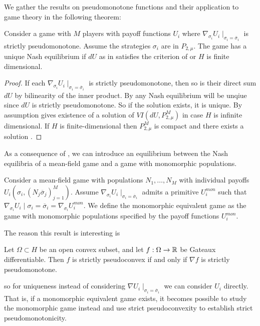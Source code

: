 We gather the results on pseudomonotone functions and their application to game theory in the following theorem:
\begin{theorem} \label{thm:nash_unique}
  Consider a game with $M$ players with payoff functions $U_i$ where $\nabla_{\sigma_i} U_i \mid_{\sigma_i = \overbar{\sigma}_i}$ is strictly pseudomonotone. Assume the strategies $\sigma_i$ are in $P_{2,\mu}$. The game has a unique Nash equilibrium if $dU$ as in  satisfies the criterion of  or $H$ is finite dimensional.
\end{theorem}
\begin{proof}
   If each $\nabla_{\sigma_i} U_i \mid_{\sigma_i = \overbar{\sigma}_i}$ is strictly pseudomonotone, then so is their direct sum $dU$ by bilinearity of the inner product. By  any Nash equilibrium will be unqiue since $dU$ is strictly pseudomonotone. So if the solution exists, it is unique. By assumption  gives existence of a solution of $VI(dU,P_{2,\mu}^M)$ in case $H$ is infinite dimensional. If $H$ is finite-dimensional then $P_{2,\mu}^M$ is compact and there exists a solution .
\end{proof}
As a consequence of , we can introduce an equilibrium between the Nash equilibria of a mean-field game and a game with monomorphic populations.
\begin{definition}
  \label{def:correspondence}
  Consider a mean-field game with populations $N_1,\dots,N_M$ with individual payoffs $U_i(\sigma_i, (N_j \overbar{\sigma}_j)_{j=1}^M)$. Assume $\nabla_{\sigma_i}U_i\mid_{\sigma_i=\overbar{\sigma}_i}$ admits a primitive $U_i^{mon}$ such that $\nabla_{\sigma_i} U_i\mid{\sigma_i = \overbar{\sigma}_i} = \nabla_{\sigma_i} U_i^{mon}$.
   We define the monomorphic equivalent game as the game with monomorphic populations specified by the payoff functions $U_i^{mon}$.
\end{definition}
The reason this result is interesting is
\begin{theorem}
  Let $\Omega \subset H$ be an open convex subset, and let $f:\Omega \to \mathbb{R}$ be Gateaux differentiable. Then $f$ is strictly pseudoconvex if and only if $\nabla f$ is strictly pseudomonotone.
\end{theorem}
so for uniqueness instead of considering $\nabla U_i \mid_{\sigma_i = \overbar{\sigma}_i}$ we can consider $U_i$ directly. That is, if a monomorphic equivalent game exists, it becomes possible to study the monomorphic game instead and use strict pseudoconvexity to establish strict pseudomonotonicity.

